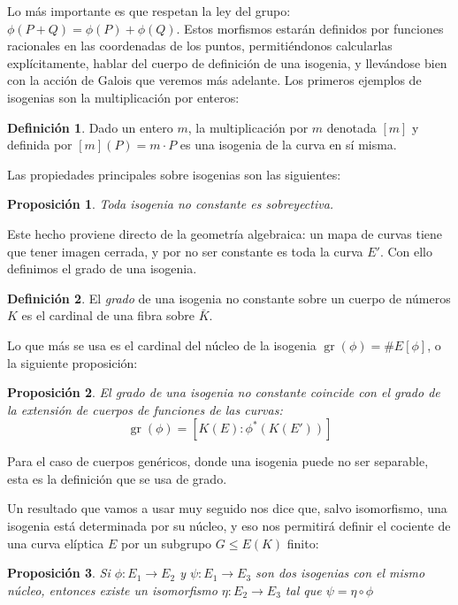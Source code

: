 \documentclass[a4paper]{book}
\theoremstyle{definition}
\newtheorem*{definition*}{Definición}
\theoremstyle{plain}
\newtheorem*{prop*}{Proposición}
\DeclareMathOperator{\gr}{gr}
\begin{document}
Lo más importante es que respetan la ley del grupo: $\phi(P+Q) = \phi(P) + \phi(Q)$. Estos morfismos estarán definidos por funciones racionales en las coordenadas de los puntos, permitiéndonos calcularlas explícitamente, hablar del cuerpo de definición de una isogenia, y llevándose bien con la acción de Galois que veremos más adelante. Los primeros ejemplos de isogenias son la multiplicación por enteros:

\begin{definition*}
Dado un entero $m$, la multiplicación por $m$ denotada $[m]$ y definida por $[m](P) = m\cdot P$ es una isogenia de la curva en sí misma.
\end{definition*}

Las propiedades principales sobre isogenias son las siguientes:

\begin{prop*}
Toda isogenia no constante es sobreyectiva.
\end{prop*}

Este hecho proviene directo de la geometría algebraica: un mapa de curvas tiene que tener imagen cerrada, y por no ser constante es toda la curva $E'$. Con ello definimos el grado de una isogenia.

\begin{definition*}
El \emph{grado} de una isogenia no constante sobre un cuerpo de números $K$ es el cardinal de una fibra sobre $\bar K$.
\end{definition*}

Lo que más se usa es el cardinal del núcleo de la isogenia $\gr (\phi) = \# E[\phi]$, o la siguiente proposición:

\begin{prop*}
El grado de una isogenia no constante coincide con el grado de la extensión de cuerpos de funciones de las curvas:
\[
\gr (\phi) = [K(E) : \phi^*(K(E'))]
\]
\end{prop*}

Para el caso de cuerpos genéricos, donde una isogenia puede no ser separable, esta es la definición que se usa de grado. 

Un resultado que vamos a usar muy seguido nos dice que, salvo isomorfismo, una isogenia está determinada por su núcleo, y eso nos permitirá definir el cociente de una curva elíptica $E$ por un subgrupo $G\leq E(K)$ finito:

\begin{prop*}
Si $\phi:E_1\to E_2$ y $\psi:E_1 \to E_3$ son dos isogenias con el mismo núcleo, entonces existe un isomorfismo $\eta :E_2 \to E_3$ tal que $\psi = \eta\circ\phi$
\end{prop*}
\end{document}
